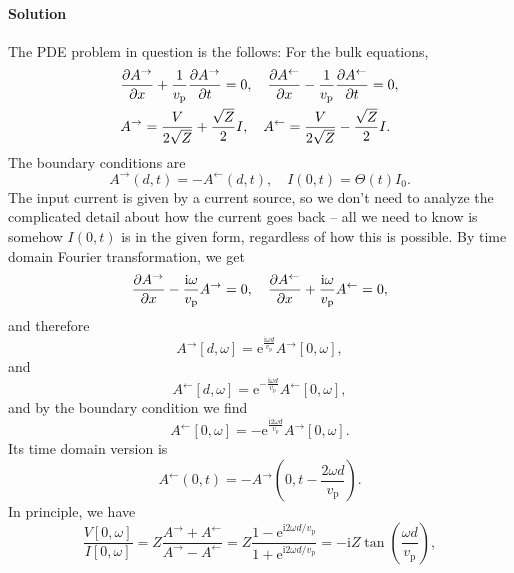 \documentclass[hyperref, a4paper]{article}
\newcommand*{\ii}{\mathrm{i}}
\newcommand*{\ee}{\mathrm{e}}
\begin{document}
\paragraph{Solution} The PDE problem in question is the follows:
For the bulk equations,
\begin{equation}
    \begin{aligned}
        &\pdv{A^\rightarrow}{x} + \frac{1}{v_{\text{p}}} \pdv{A^\rightarrow}{t} = 0, \quad 
         \pdv{A^\leftarrow}{x}  - \frac{1}{v_{\text{p}}} \pdv{A^\leftarrow}{t} = 0, \\
        &A^{\rightarrow} = \frac{V}{2 \sqrt{Z}} + \frac{\sqrt{Z}}{2} I, \quad 
         A^{\leftarrow } = \frac{V}{2 \sqrt{Z}} - \frac{\sqrt{Z}}{2} I.
    \end{aligned}
\end{equation}
The boundary conditions are 
\begin{equation}
    A^{\rightarrow}(d, t) = - A^{\leftarrow}(d, t), \quad 
    I(0, t) = \Theta(t) I_0.
\end{equation}
The input current is given by a current source,
so we don't need to analyze the complicated detail about how the current goes back -- 
all we need to know is somehow $I(0, t)$ is in the given form, regardless of how this is possible.
By time domain Fourier transformation, we get 
\begin{equation}
    \pdv{A^\rightarrow}{x} - \frac{\ii \omega}{v_{\text{p}}} A^{\rightarrow} = 0, \quad 
    \pdv{A^\leftarrow }{x} + \frac{\ii \omega}{v_{\text{p}}} A^{\leftarrow } = 0,
\end{equation}
and therefore 
\[
    A^{\rightarrow}[d, \omega] = \ee^{\frac{\ii \omega d}{v_{\text{p}}}} A^{\rightarrow}[0, \omega],
\]
and 
\[
    A^{\leftarrow}[d, \omega] = \ee^{- \frac{\ii \omega d}{v_{\text{p}}}} A^{\leftarrow}[0, \omega],
\]
and by the boundary condition we find 
\begin{equation}
    A^{\leftarrow}[0, \omega] = - \ee^{\frac{\ii 2 \omega d}{v_{\text{p}}}} A^{\rightarrow}[0, \omega].
\end{equation}
Its time domain version is 
\begin{equation}
    A^{\leftarrow}(0, t) = - A^{\rightarrow}\left(0, t - \frac{2 \omega d}{v_{\text{p}}}\right).
\end{equation}
In principle, we have 
\begin{equation}
    \frac{V[0, \omega]}{I[0, \omega]} = Z \frac{A^{\rightarrow} + A^{\leftarrow}}{A^{\rightarrow} - A^{\leftarrow}}
    = Z \frac{1 - \ee^{\ii 2 \omega d / v_{\text{p}}}}{1 + \ee^{\ii 2 \omega d / v_{\text{p}}}}
    = - \ii Z \tan(\frac{\omega d}{v_{\text{p}}}),
\end{equation}
\end{document}
